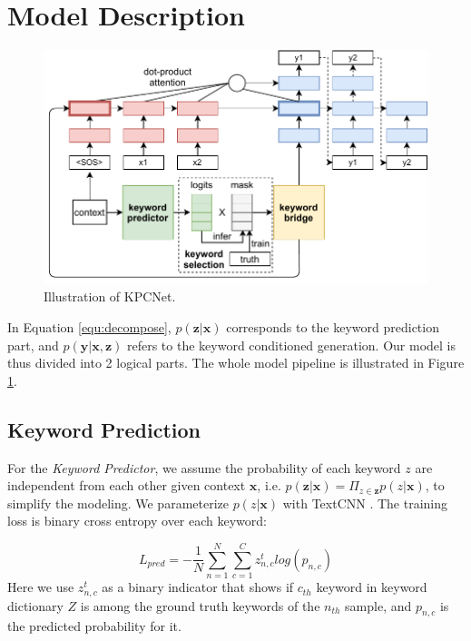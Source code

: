 \section{Model Description}
\label{sec:KPCNet}

\begin{figure}[htbp]
  \centering
  \includegraphics[width=1\linewidth]{kwd_model.pdf}
  \caption{Illustration of KPCNet.}
  \label{fig:pipeline}
  \end{figure}

  In Equation \ref{equ:decompose}, $p(\mathbf{z}|\mathbf{x})$ corresponds to the keyword prediction part, and $p(\mathbf{y}|\mathbf{x},\mathbf{z})$ refers to the keyword conditioned generation. Our model is thus divided into 2 logical parts. The whole model pipeline is illustrated in Figure \ref{fig:pipeline}.  

\subsection{Keyword Prediction}
\label{sec:prediction}

For the \textit{Keyword Predictor}, we assume the probability of each keyword $z$ are independent from each other given context $\mathbf{x}$, i.e. $p(\mathbf{z}|\mathbf{x})=\Pi_{z \in \mathbf{z}}p(z|\mathbf{x})$, to simplify the modeling. We parameterize $p(z|\mathbf{x})$ with TextCNN \citep{kim-2014-convolutional}. The training loss is binary cross entropy over each keyword: 


\begin{equation}
  L_{pred} = -\frac{1}{N}\sum_{n=1}^{N}\sum_{c=1}^{C}z^t_{n,c}log(p_{n,c})
  \label{equ:pred}
\end{equation}
Here we use $z^t_{n,c}$ as a binary indicator that shows if $c_{th}$ keyword in keyword dictionary $Z$ is among the ground truth keywords of the $n_{th}$ sample, and $p_{n,c}$ is the predicted probability for it.


